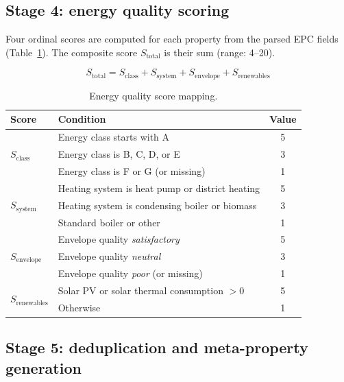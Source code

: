 \documentclass[runningheads,orivec]{llncs}
\begin{document}
\subsection{Stage 4: energy quality scoring}
\label{sec:scoring}

Four ordinal scores are computed for each property from the
parsed EPC fields (Table~\ref{tab:energy_scores}). The composite
score $S_\text{total}$ is their sum (range: 4--20).

\begin{equation}
  S_\text{total} = S_\text{class} + S_\text{system} +
                   S_\text{envelope} + S_\text{renewables}
\end{equation}

\begin{table}[h]
\centering
\caption{Energy quality score mapping.}
\label{tab:energy_scores}
\begin{tabularx}{\textwidth}{lXc}
\toprule
\textbf{Score} & \textbf{Condition} & \textbf{Value} \\
\midrule
\multirow{3}{*}{$S_\text{class}$}
  & Energy class starts with A & 5 \\
  & Energy class is B, C, D, or E & 3 \\
  & Energy class is F or G (or missing) & 1 \\
\midrule
\multirow{3}{*}{$S_\text{system}$}
  & Heating system is heat pump or district heating & 5 \\
  & Heating system is condensing boiler or biomass  & 3 \\
  & Standard boiler or other  & 1 \\
\midrule
\multirow{3}{*}{$S_\text{envelope}$}
  & Envelope quality \textit{satisfactory} & 5 \\
  & Envelope quality \textit{neutral}       & 3 \\
  & Envelope quality \textit{poor} (or missing) & 1 \\
\midrule
\multirow{2}{*}{$S_\text{renewables}$}
  & Solar PV or solar thermal consumption $> 0$ & 5 \\
  & Otherwise & 1 \\
\bottomrule
\end{tabularx}
\end{table}

\subsection{Stage 5: deduplication and meta-property generation}
\label{sec:dedup}
\end{document}
